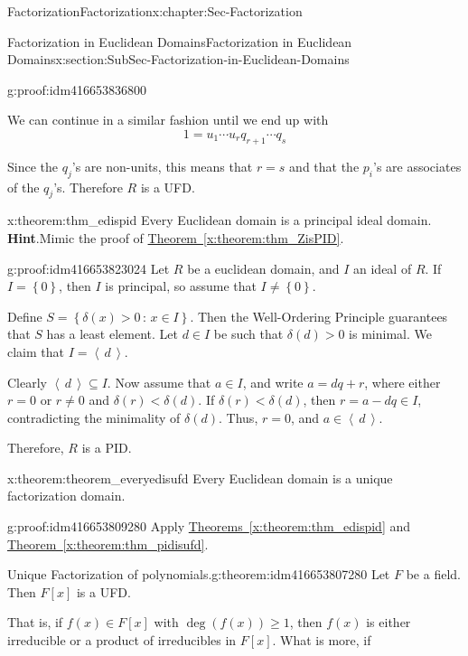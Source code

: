 \documentclass[oneside,10pt,]{book}
\numberwithin{equation}{section}
\renewcommand{\ge}{\geqslant}
\newcommand{\ideal}[1]{\left\langle\, #1 \,\right\rangle}
\newcommand{\set}[1]{\left\{ {#1} \right\}}
\newcommand{\setof}[2]{{\left\{#1\,\colon\,#2\right\}}}
\newcommand{\lt}{<}
\begin{document}
\begin{chapterptx}{Factorization}{}{Factorization}{}{}{x:chapter:Sec-Factorization}
\begin{sectionptx}{Factorization in Euclidean Domains}{}{Factorization in Euclidean Domains}{}{}{x:section:SubSec-Factorization-in-Euclidean-Domains}
\begin{proofptx}{}{g:proof:idm416653836800}
\begin{equation*}
\end{equation*}
%
\par
We can continue in a similar fashion until we end up with%
\begin{equation*}
1=u_1\cdots u_rq_{r+1}\cdots q_s
\end{equation*}
%
\par
Since the \(q_j\)'s are non-units, this means that \(r=s\) and that the \(p_i\)'s are associates of the \(q_j\)'s. Therefore \(R\) is a UFD.%
\end{proofptx}
\begin{theorem}{}{}{x:theorem:thm_edispid}%
Every Euclidean domain is a principal ideal domain.%
\textbf{Hint}.\quad{}Mimic the proof of \hyperref[x:theorem:thm_ZisPID]{Theorem~\ref{x:theorem:thm_ZisPID}}.%
\end{theorem}
\begin{proofptx}{}{g:proof:idm416653823024}
Let \(R\) be a euclidean domain, and \(I\) an ideal of \(R\). If \(I = \set{0}\), then \(I\) is principal, so assume that \(I\ne \set{0}\).%
\par
Define \(S = \setof{\delta(x)>0}{x\in I}\). Then the Well-Ordering Principle guarantees that \(S\) has a least element. Let \(d\in I\) be such that \(\delta(d) > 0\) is minimal. We claim that \(I = \ideal{d}\).%
\par
Clearly \(\ideal{d}\subseteq I\). Now assume that \(a\in I\), and write \(a = dq + r\), where either \(r = 0\) or \(r\ne 0\) and \(\delta(r) \lt \delta(d)\). If \(\delta(r) \lt \delta(d)\), then \(r = a - dq \in I\), contradicting the minimality of \(\delta(d)\). Thus, \(r = 0\), and \(a\in \ideal{d}\).%
\par
Therefore, \(R\) is a PID.%
\end{proofptx}
\begin{theorem}{}{}{x:theorem:theorem_everyedisufd}%
Every Euclidean domain is a unique factorization domain.%
\end{theorem}
\begin{proofptx}{}{g:proof:idm416653809280}
Apply \hyperref[x:theorem:thm_edispid]{Theorems~\ref{x:theorem:thm_edispid}} and \hyperref[x:theorem:thm_pidisufd]{Theorem~\ref{x:theorem:thm_pidisufd}}.%
\end{proofptx}
\begin{theorem}{Unique Factorization of polynomials.}{}{g:theorem:idm416653807280}%
Let \(F\) be a field. Then \(F[x]\) is a UFD.%
\par
That is, if \(f(x) \in F[x]\) with \(\deg(f(x)) \ge 1\), then \(f(x)\) is either irreducible or a product of irreducibles in \(F[x]\). What is more, if%

\end{theorem}
\end{sectionptx}
\end{chapterptx}
\end{document}
